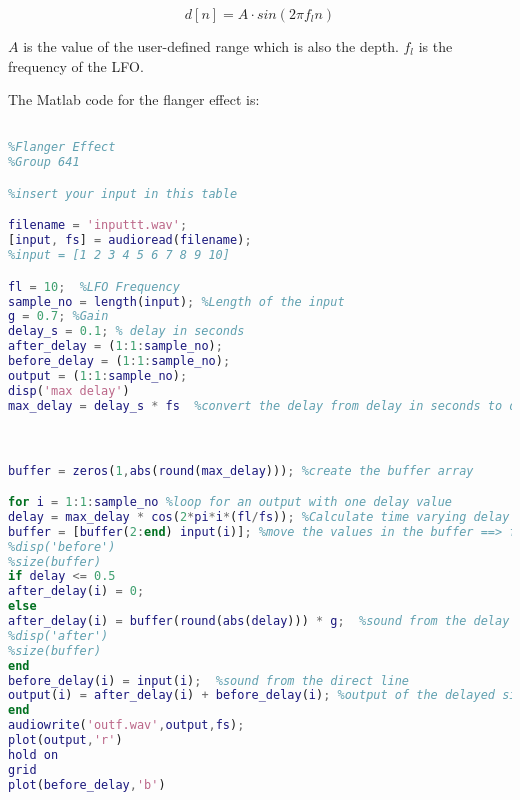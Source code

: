 \begin{equation}
	d[n]= A \cdot sin(2\pi f_{l} n)
\end{equation}

$A$ is the value of the user-defined range which is also the depth. $f_{l}$ is the frequency of the LFO. 

The Matlab code for the flanger effect is:

\begin{lstlisting}[language=Matlab, caption= Matlab code for flanger effect]

%Flanger Effect
%Group 641

%insert your input in this table

filename = 'inputtt.wav';
[input, fs] = audioread(filename);
%input = [1 2 3 4 5 6 7 8 9 10]

fl = 10;  %LFO Frequency
sample_no = length(input); %Length of the input
g = 0.7; %Gain
delay_s = 0.1; % delay in seconds 
after_delay = (1:1:sample_no); 
before_delay = (1:1:sample_no);
output = (1:1:sample_no);
disp('max delay')
max_delay = delay_s * fs  %convert the delay from delay in seconds to delay in samples



buffer = zeros(1,abs(round(max_delay))); %create the buffer array 

for i = 1:1:sample_no %loop for an output with one delay value
delay = max_delay * cos(2*pi*i*(fl/fs)); %Calculate time varying delay (unit is samples)
buffer = [buffer(2:end) input(i)]; %move the values in the buffer ==> first value overwritten, one new value added at the end
%disp('before')
%size(buffer)
if delay <= 0.5
after_delay(i) = 0;
else
after_delay(i) = buffer(round(abs(delay))) * g;  %sound from the delay line in the block diagram
%disp('after')
%size(buffer)
end
before_delay(i) = input(i);  %sound from the direct line
output(i) = after_delay(i) + before_delay(i); %output of the delayed signal 
end
audiowrite('outf.wav',output,fs);
plot(output,'r')
hold on
grid
plot(before_delay,'b')





\end{lstlisting}





